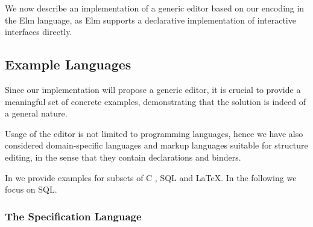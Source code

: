 \documentclass[sigplan]{acmart}
\begin{document}
We now describe an implementation of a generic editor based on our
encoding in the Elm language, as Elm supports a declarative
implementation of interactive interfaces directly.

\subsection{Example Languages}

Since our implementation will propose a generic editor, it is crucial
to provide a meaningful set of concrete examples, demonstrating that
the solution is indeed of a general nature.  %


Usage of the editor is not limited to programming languages, hence we
have also considered domain-specific languages and markup languages
suitable for structure editing, in the sense that they contain
declarations and binders.

In \cite{sunemsc} we provide examples for subsets of C
\cite{c-iso-standard}, SQL\cite{postgresql-about} and
\LaTeX\cite{latex-about}. In the following we focus on SQL.




\subsubsection{The Specification Language}
\end{document}
